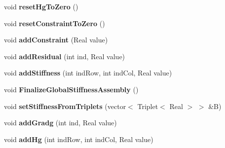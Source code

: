 \begin{DoxyCompactItemize}
\item 
\hypertarget{structvoom_1_1_eigen_elliptic_result_a429390f29e989f82af78c6ffe89d41f4}{
void {\bfseries resetHgToZero} ()}
\label{structvoom_1_1_eigen_elliptic_result_a429390f29e989f82af78c6ffe89d41f4}

\item 
\hypertarget{structvoom_1_1_eigen_elliptic_result_ab4148bac1705140bdefb6363731a1680}{
void {\bfseries resetConstraintToZero} ()}
\label{structvoom_1_1_eigen_elliptic_result_ab4148bac1705140bdefb6363731a1680}

\item 
\hypertarget{structvoom_1_1_eigen_elliptic_result_a30044f205781c00cea5d86fb7be9af51}{
void {\bfseries addConstraint} (Real value)}
\label{structvoom_1_1_eigen_elliptic_result_a30044f205781c00cea5d86fb7be9af51}

\item 
\hypertarget{structvoom_1_1_eigen_elliptic_result_ac9b2d06f65ddb235e550078bc9f5a0d0}{
void {\bfseries addResidual} (int ind, Real value)}
\label{structvoom_1_1_eigen_elliptic_result_ac9b2d06f65ddb235e550078bc9f5a0d0}

\item 
\hypertarget{structvoom_1_1_eigen_elliptic_result_ab9cafe285c4d4abc4dccce3a1ed034a0}{
void {\bfseries addStiffness} (int indRow, int indCol, Real value)}
\label{structvoom_1_1_eigen_elliptic_result_ab9cafe285c4d4abc4dccce3a1ed034a0}

\item 
\hypertarget{structvoom_1_1_eigen_elliptic_result_a9cdefa63c233eda1136b25f278307fff}{
void {\bfseries FinalizeGlobalStiffnessAssembly} ()}
\label{structvoom_1_1_eigen_elliptic_result_a9cdefa63c233eda1136b25f278307fff}

\item 
\hypertarget{structvoom_1_1_eigen_elliptic_result_aeafd057e2864192ef851522f3455da3e}{
void {\bfseries setStiffnessFromTriplets} (vector$<$ Triplet$<$ Real $>$ $>$ \&B)}
\label{structvoom_1_1_eigen_elliptic_result_aeafd057e2864192ef851522f3455da3e}

\item 
\hypertarget{structvoom_1_1_eigen_elliptic_result_a7f0038dfd5e5add819ff312543c56e4a}{
void {\bfseries addGradg} (int ind, Real value)}
\label{structvoom_1_1_eigen_elliptic_result_a7f0038dfd5e5add819ff312543c56e4a}

\item 
\hypertarget{structvoom_1_1_eigen_elliptic_result_a4aef4d218df7228df8c812f027496fd7}{
void {\bfseries addHg} (int indRow, int indCol, Real value)}
\label{structvoom_1_1_eigen_elliptic_result_a4aef4d218df7228df8c812f027496fd7}


\end{DoxyCompactItemize}
